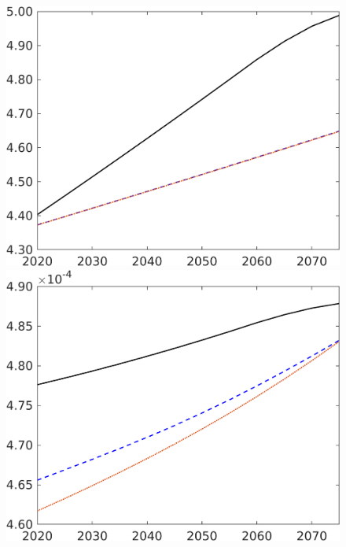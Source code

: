 \begin{figure}[h!!]
\begin{minipage}[]{0.32\textwidth}
\end{minipage}
\begin{minipage}[]{0.32\textwidth}
	\includegraphics[width=1\textwidth]{../../codding_model/own_basedOnFried/optimalPol_elastS_DisuSci/figures/all_1705/An_CompEffOPT_NOT_NoTaus_spillover0_sep1_BN0_ineq0_red0_etaa0.79_lgd0.png}
\end{minipage}
	\begin{minipage}[]{0.32\textwidth}
		\includegraphics[width=1\textwidth]{../../codding_model/own_basedOnFried/optimalPol_elastS_DisuSci/figures/all_1705/Lg_CompEffOPT_NOT_NoTaus_spillover0_sep1_BN0_ineq0_red0_etaa0.79_lgd0.png}

\end{minipage}
\end{figure}
